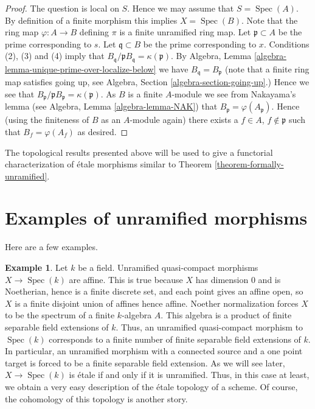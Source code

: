 \documentclass{stacks-project}
\theoremstyle{plain}
\theoremstyle{definition}
\newtheorem{example}[subsection]{Example}
\theoremstyle{remark}
\numberwithin{equation}{subsection}
\def\Spec{\mathop{\mathrm{Spec}}}
\begin{document}
\begin{proof}
The question is local on $S$. Hence we may assume that $S = \Spec(A)$.
By definition of a finite morphism this implies $X = \Spec(B)$.
Note that the ring map $\varphi : A \to B$ defining $\pi$
is a finite unramified ring map.
Let $\mathfrak p \subset A$ be the prime corresponding to $s$.
Let $\mathfrak q \subset B$ be the prime corresponding to $x$.
Conditions (2), (3) and (4) imply that
$B_{\mathfrak q}/\mathfrak pB_{\mathfrak q} = \kappa(\mathfrak p)$.
By Algebra, Lemma \ref{algebra-lemma-unique-prime-over-localize-below}
we have $B_{\mathfrak q} = B_{\mathfrak p}$
(note that a finite ring map satisfies going up, see
Algebra, Section \ref{algebra-section-going-up}.)
Hence we see that
$B_{\mathfrak p}/\mathfrak pB_{\mathfrak p} = \kappa(\mathfrak p)$.
As $B$ is a finite $A$-module we see from Nakayama's lemma (see
Algebra, Lemma \ref{algebra-lemma-NAK})
that $B_{\mathfrak p} = \varphi(A_{\mathfrak p})$. Hence (using the finiteness
of $B$ as an $A$-module again) there exists a
$f \in A$, $f \not \in \mathfrak p$ such that $B_f = \varphi(A_f)$
as desired.
\end{proof}

\noindent
The topological results presented above will be used to give a functorial
characterization of \'etale morphisms similar to Theorem
\ref{theorem-formally-unramified}.




\section{Examples of unramified morphisms}
\label{section-examples}

\noindent
Here are a few examples.

\begin{example}
\label{example-etale-field-extensions}
Let $k$ be a field.
Unramified quasi-compact morphisms $X \to \Spec(k)$ are affine.
This is true because $X$ has dimension $0$ and is Noetherian,
hence is a finite discrete set, and each point gives an affine open,
so $X$ is a finite disjoint union of affines hence affine.
Noether normalization forces $X$ to be the spectrum of a finite
$k$-algebra $A$.
This algebra is a product of finite separable field extensions of $k$.
Thus, an unramified quasi-compact morphism to $\Spec(k)$
corresponds to a finite number of finite separable field extensions of $k$.
In particular, an unramified morphism with a connected source and a one point
target is forced to be a finite separable field extension.
As we will see later, $X \to \Spec(k)$ is \'etale if and
only if it is unramified. Thus, in this case at least, we obtain a very easy
description of the \'etale topology of a scheme. Of course, the cohomology of
this topology is another story.
\end{example}
\end{document}
